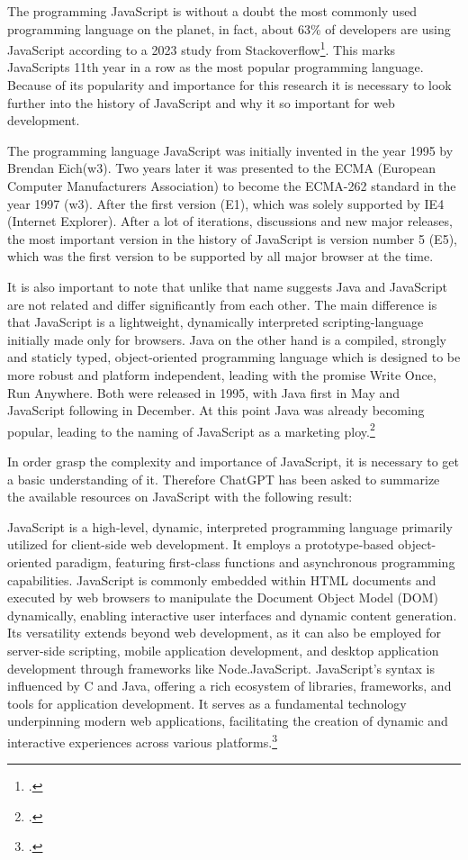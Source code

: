 The programming JavaScript is without a doubt the most commonly used programming language on the planet, in fact, about 63\% of developers are using JavaScript according to a 2023 study from Stackoverflow\footcite{stackoverflow_stack_nodate}. This marks JavaScripts 11th year in a row as the most popular programming language. Because of its popularity and importance for this research it is necessary to look further into the history of JavaScript and why it so important for web development.

The programming language JavaScript was initially invented in the year 1995 by Brendan Eich(w3). Two years later it was presented to the ECMA (European Computer Manufacturers Association) to become the ECMA-262 standard in the year 1997 (w3). After the first version (E1), which was solely supported by IE4 (Internet Explorer).
After a lot of iterations, discussions and new major releases, the most important version in the history of JavaScript is version number 5 (E5), which was the first version to be supported by all major browser at the time.

It is also important to note that unlike that name suggests Java and JavaScript are not related and differ significantly from each other.  The main difference is that JavaScript is a lightweight, dynamically interpreted scripting-language initially made only for browsers. Java on the other hand is a compiled, strongly and staticly typed, object-oriented programming language which is designed to be more robust and platform independent, leading with the promise \dq Write Once, Run Anywhere\dq . Both were released in 1995, with Java first in May and JavaScript following in December. At this point Java was already becoming popular, leading to the naming of JavaScript as a marketing ploy.\footcite{fin_js_brendan_2016}

In order grasp the complexity and importance of JavaScript, it is necessary to get a basic understanding of it. Therefore ChatGPT has been asked to summarize the available resources on JavaScript with the following result:

\dq JavaScript is a high-level, dynamic, interpreted programming language primarily utilized for client-side web development. It employs a prototype-based object-oriented paradigm, featuring first-class functions and asynchronous programming capabilities. JavaScript is commonly embedded within HTML documents and executed by web browsers to manipulate the Document Object Model (DOM) dynamically, enabling interactive user interfaces and dynamic content generation. Its versatility extends beyond web development, as it can also be employed for server-side scripting, mobile application development, and desktop application development through frameworks like Node.JavaScript. JavaScript's syntax is influenced by C and Java, offering a rich ecosystem of libraries, frameworks, and tools for application development. It serves as a fundamental technology underpinning modern web applications, facilitating the creation of dynamic and interactive experiences across various platforms.\dq\footcite{openai_chatgpt_nodate}

